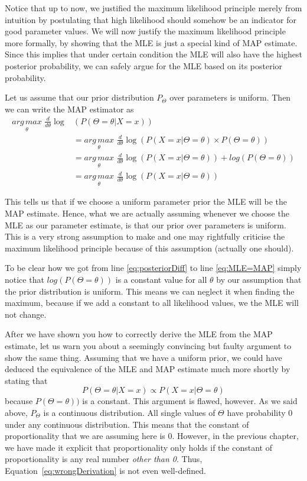 Notice that up to now, we justified the maximum likelihood principle merely from intuition by postulating that high likelihood should somehow be an indicator for
good parameter values. We will now justify the maximum likelihood principle more formally, by showing that the MLE is just a special kind of MAP estimate. Since
this implies that under certain condition the MLE will also have the highest posterior probability, we can safely argue for the MLE based on its posterior probability.

Let us assume that our prior distribution $ P_{\Theta} $ over parameters is uniform. Then we can write the MAP estimator as
\begin{align}
\underset{\theta}{arg\,max}\, \, \frac{d}{d\theta} \log &(P(\Theta = \theta| X=x)) \\
&= \underset{\theta}{arg\,max}\, \, \frac{d}{d\theta}\log (P(X=x|\Theta=\theta) \times P(\Theta = \theta)) \\
&= \underset{\theta}{arg\,max}\, \, \frac{d}{d\theta}\log (P(X=x|\Theta=\theta)) + log(P(\Theta = \theta)) \label{eq:posteriorDiff} \\
&= \underset{\theta}{arg\,max}\, \, \frac{d}{d\theta}\log (P(X=x|\Theta=\theta)) \label{eq:MLE=MAP}
\end{align}

This tells us that if we choose a uniform parameter prior the MLE will be the MAP estimate. Hence, what we are actually assuming whenever we choose the MLE as
our parameter estimate, is that our prior over parameters is uniform. This is a very strong assumption to make and one may rightfully criticise the maximum likelihood
principle because of this assumption (actually one should).

To be clear how we got from line \eqref{eq:posteriorDiff} to line \eqref{eq:MLE=MAP} simply notice that $ log(P(\Theta = \theta)) $ is a constant value for all $ \theta $
by our assumption that the prior distribution is uniform. This means we can neglect it when finding the maximum, because if we add a constant to all likelihood values,
we the MLE will not change. 

After we have shown you how to correctly derive the MLE from the MAP estimate, let us warn you about a seemingly convincing but faulty argument to show the same thing.
Assuming that we have a uniform prior, we could have deduced the equivalence of the MLE and MAP estimate much more shortly by stating that
\begin{equation}
P(\Theta = \theta| X=x) \propto P(X=x|\Theta=\theta) \label{eq:wrongDerivation}
\end{equation}
because $ P(\Theta = \theta)) $ is a constant. This argument is flawed, however. As we said above, $ P_{\Theta} $ is a continuous distribution. All single values of
$ \Theta $ have probability 0 under any continuous distribution. This means that the constant of proportionality that we are assuming here is 0. However, in the
previous chapter, we have made it explicit that proportionality only holds if the constant of proportionality is any real number \emph{other than 0}. Thus, 
Equation~\eqref{eq:wrongDerivation} is not even well-defined.

